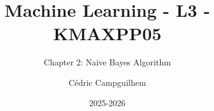 \documentclass[10pt,handout]{beamer}  %
\title{Machine Learning - L3 - KMAXPP05}
\subtitle{Chapter 2: Naive Bayes Algorithm}
\author{Cédric Campguilhem}
\institute[]{
	Airbus Operations \\
	\href{mailto:cedric.campguilhem@airbus.com}{\texttt{cedric.campguilhem@airbus.com}}
}
\date{2025-2026}
\begin{document}
	
	\begin{frame}
		\titlepage
	\end{frame}
	
	
	
	
	
	
	
\end{document}
